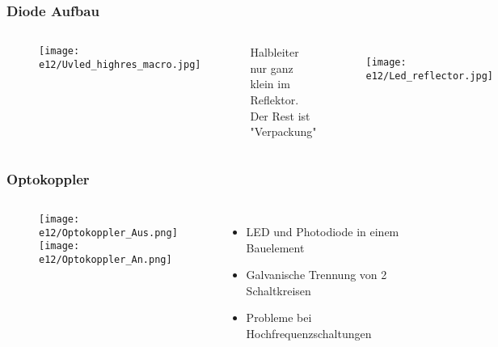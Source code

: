 \begin{frame}
    \frametitle{Diode Aufbau}
    \begin{columns}[c]
        \column[c]{5cm}
        \begin{center}
	\begin{figure}
            \texttt{[image: e12/Uvled\_highres\_macro.jpg]}\\
	\end{figure}
        \end{center}
        \column{5cm}
            Halbleiter nur ganz klein im Reflektor. Der Rest ist "Verpackung"\\ 
	 \begin{figure}
            \texttt{[image: e12/Led\_reflector.jpg]}
	\end{figure}
    \end{columns}
\end{frame}

\begin{frame}
    \frametitle{Optokoppler}
    \begin{columns}[c]
        \column[c]{5cm}
        \begin{center}
	\begin{figure}
            \texttt{[image: e12/Optokoppler\_Aus.png]}\\
            \texttt{[image: e12/Optokoppler\_An.png]}
	\end{figure}
        \end{center}
        \column{5cm}
    \begin{itemize}
			\item LED und Photodiode in einem Bauelement
			\item Galvanische Trennung von 2 Schaltkreisen
			\item Probleme bei Hochfrequenzschaltungen
    \end{itemize}
    \end{columns}
\end{frame}


